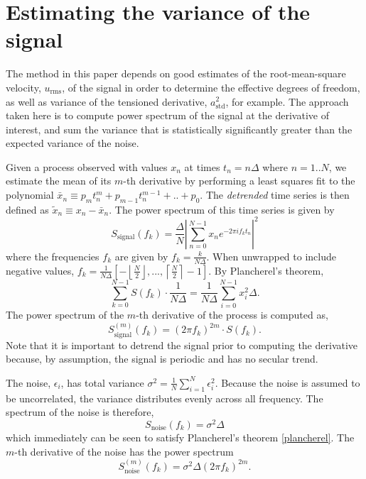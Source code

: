 \documentclass[10pt,journal]{IEEEtran}
\begin{document}
\section{Estimating the variance of the signal}
\label{sec:variance_estimate}

The method in this paper depends on good estimates of the root-mean-square velocity, $u_{\textrm{rms}}$, of the signal in order to determine the effective degrees of freedom, as well as variance of the tensioned derivative, $a_{\textrm{std}}^2$, for example. The approach taken here is to compute power spectrum of the signal at the derivative of interest, and sum the variance that is statistically significantly greater than the expected variance of the noise.

Given a process observed with values $x_n$ at times $t_n = n \Delta$ where $n=1..N$, we estimate the mean of its $m$-th derivative by performing a least squares fit to the polynomial $\bar{x}_n \equiv p_m t_n^m + p_{m-1} t_n^{m-1} + .. + p_0$. The \emph{detrended} time series is then defined as $\tilde{x}_n \equiv x_n - \bar{x}_n$. The power spectrum of this time series is given by
\begin{equation}
S_{\textrm{signal}}(f_k) = \frac{\Delta}{N} \left\lvert \sum_{n=0}^{N-1} x_n e^{-2\pi i f_k t_n} \right\rvert^2
\end{equation}
where the frequencies $f_k$ are given by $f_k = \frac{k}{N\Delta}$. When unwrapped to include negative values, $f_k = \frac{1}{N \Delta} \left[ -\left\lfloor \frac{N}{2} \right\rfloor,...,\left\lceil \frac{N}{2} \right\rceil -1 \right]$. By Plancherel's theorem,
\begin{equation}
\label{plancherel}
\sum_{k=0}^{N-1} S(f_k) \cdot \frac{1}{N \Delta} = \frac{1}{N \Delta} \sum_{i=0}^{N-1} x_i^2 \Delta.
\end{equation}
The power spectrum of the $m$-th derivative of the process is computed as,
\begin{equation}
S_{\textrm{signal}}^{(m)}(f_k) = (2 \pi f_k)^{2m} \cdot S(f_k).
\end{equation}
Note that it is important to detrend the signal prior to computing the derivative because, by assumption, the signal is periodic and has no secular trend.

The noise, $\epsilon_i$, has total variance $\sigma^2 = \frac{1}{N} \sum_{i=1}^{N} \epsilon_i^2$. Because the noise is assumed to be uncorrelated, the variance distributes evenly across all frequency. The spectrum of the noise is therefore,
\begin{equation}
S_{\textrm{noise}}(f_k) = \sigma^2 \Delta
\end{equation}
which immediately can be seen to satisfy Plancherel's theorem \ref{plancherel}. The $m$-th derivative of the noise has the power spectrum
\begin{equation}
S_{\textrm{noise}}^{(m)}(f_k) = \sigma^2 \Delta (2 \pi f_k)^{2m}.
\end{equation}
\end{document}
